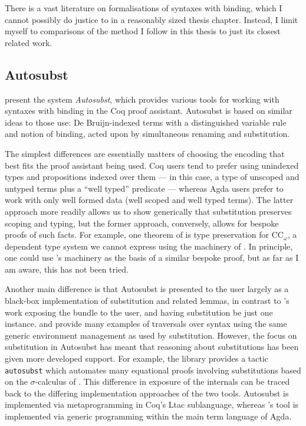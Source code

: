 There is a vast literature on formalisations of syntaxes with binding, which I
cannot possibly do justice to in a reasonably sized thesis chapter.
Instead, I limit myself to comparisons of the \citet{AACMM21} method I follow in
this thesis to just its closest related work.

\subsection{Autosubst}

\citet{Autosubst15} present the system \emph{Autosubst}, which provides various
tools for working with syntaxes with binding in the Coq proof assistant.
Autosubst is based on similar ideas to those \citeauthor{AACMM21} use:
De Bruijn-indexed terms with a distinguished variable rule and notion of
binding, acted upon by simultaneous renaming and substitution.

The simplest differences are essentially matters of choosing the encoding that
best fits the proof assistant being used.
Coq users tend to prefer using unindexed types and propositions indexed over
them --- in this case, a type of unscoped and untyped terms plus a
``well typed'' predicate --- whereas Agda users prefer to work with only well
formed data (well scoped and well typed terms).
The latter approach more readily allows us to show generically that substitution
preserves scoping and typing, but the former approach, conversely, allows for
bespoke proofs of such facts.
For example, one theorem of \citet{Autosubst15} is type preservation for
$\mathrm{CC}_\omega$, a dependent type system we cannot express using the
machinery of \citet{AACMM21}.
In principle, one could use \citeauthor{AACMM21}'s machinery as the basis of a
similar bespoke proof, but as far as I am aware, this has not been tried.

Another main difference is that Autosubst is presented to the user largely as
a black-box implementation of substitution and related lemmas, in contrast to
\citeauthor{AACMM21}'s work exposing the  bundle to the
user, and having substitution be just one instance.
 and \citet{AACMM21} provide many examples of traversals over
syntax using the same generic environment management as used by substitution.
However, the focus on substitution in Autosubst has meant that reasoning about
substitutions has been given more developed support.
For example, the library provides a tactic \texttt{autosubst} which automates
many equational proofs involving substitutions based on the $\sigma$-calculus of
\citet{ACCL91}.
This difference in exposure of the internals can be traced back to the differing
implementation approaches of the two tools.
Autosubst is implemented via metaprogramming in Coq's Ltac sublanguage, whereas
\citeauthor{AACMM21}'s tool is implemented via generic programming within the
main term language of Agda.

